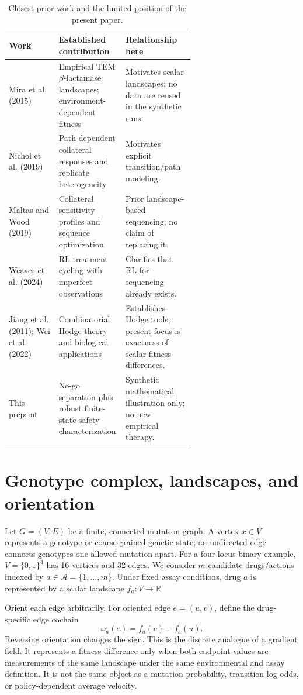 \documentclass[11pt]{article}
\theoremstyle{definition}\newtheorem{definition}[proposition]{Definition}\theoremstyle{remark}\newtheorem{remark}[proposition]{Remark}
\newcommand{\R}{\mathbb{R}}\newcommand{\V}{\mathcal{V}}\newcommand{\A}{\mathcal{A}}\newcommand{\Ssafe}{\mathcal{S}}\newcommand{\Rrisk}{\mathcal{R}}\newcommand{\Kviab}{\mathcal{K}}\newcommand{\E}{\mathbb{E}}\newcommand{\Prob}{\mathbb{P}}\newcommand{\ind}{\mathbf{1}}
\begin{document}
\begin{table}[htbp]\centering\small\caption{Closest prior work and the limited position of the present paper.}\label{tab:literature}\begin{tabularx}{\linewidth}{p{0.27\linewidth}p{0.36\linewidth}X}\toprule Work & Established contribution & Relationship here\\\midrule Mira et al. (2015) & Empirical TEM $\beta$-lactamase landscapes; environment-dependent fitness & Motivates scalar landscapes; no data are reused in the synthetic runs.\\ Nichol et al. (2019) & Path-dependent collateral responses and replicate heterogeneity & Motivates explicit transition/path modeling.\\ Maltas and Wood (2019) & Collateral sensitivity profiles and sequence optimization & Prior landscape-based sequencing; no claim of replacing it.\\ Weaver et al. (2024) & RL treatment cycling with imperfect observations & Clarifies that RL-for-sequencing already exists.\\ Jiang et al. (2011); Wei et al. (2022) & Combinatorial Hodge theory and biological applications & Establishes Hodge tools; present focus is exactness of scalar fitness differences.\\ This preprint & No-go separation plus robust finite-state safety characterization & Synthetic mathematical illustration only; no new empirical therapy.\\\bottomrule\end{tabularx}\end{table}

\section{Genotype complex, landscapes, and orientation}
Let $G=(V,E)$ be a finite, connected mutation graph. A vertex $x\in V$ represents a genotype or coarse-grained genetic state; an undirected edge connects genotypes one allowed mutation apart. For a four-locus binary example, $V=\{0,1\}^4$ has 16 vertices and 32 edges. We consider $m$ candidate drugs/actions indexed by $a\in\A=\{1,\ldots,m\}$. Under fixed assay conditions, drug $a$ is represented by a scalar landscape $f_a:V\to\R$.

Orient each edge arbitrarily. For oriented edge $e=(u,v)$, define the drug-specific edge cochain
\begin{equation}\label{eq:edge}\omega_a(e)=f_a(v)-f_a(u).\end{equation}
Reversing orientation changes the sign. This is the discrete analogue of a gradient field. It represents a fitness difference only when both endpoint values are measurements of the same landscape under the same environmental and assay definition. It is not the same object as a mutation probability, transition log-odds, or policy-dependent average velocity.
\end{document}

